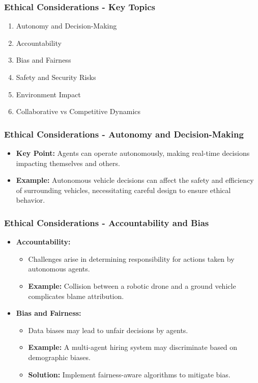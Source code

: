 \documentclass[aspectratio=169]{beamer}
\begin{document}
\begin{frame}[fragile]
    \frametitle{Ethical Considerations - Key Topics}
    \begin{enumerate}
        \item Autonomy and Decision-Making
        \item Accountability
        \item Bias and Fairness
        \item Safety and Security Risks
        \item Environment Impact
        \item Collaborative vs Competitive Dynamics
    \end{enumerate}
\end{frame}

\begin{frame}[fragile]
    \frametitle{Ethical Considerations - Autonomy and Decision-Making}
    \begin{itemize}
        \item \textbf{Key Point:} Agents can operate autonomously, making real-time decisions impacting themselves and others.
        \item \textbf{Example:} Autonomous vehicle decisions can affect the safety and efficiency of surrounding vehicles, necessitating careful design to ensure ethical behavior.
    \end{itemize}
\end{frame}

\begin{frame}[fragile]
    \frametitle{Ethical Considerations - Accountability and Bias}
    \begin{itemize}
        \item \textbf{Accountability:}
        \begin{itemize}
            \item Challenges arise in determining responsibility for actions taken by autonomous agents.
            \item \textbf{Example:} Collision between a robotic drone and a ground vehicle complicates blame attribution.
        \end{itemize}
        
        \item \textbf{Bias and Fairness:}
        \begin{itemize}
            \item Data biases may lead to unfair decisions by agents.
            \item \textbf{Example:} A multi-agent hiring system may discriminate based on demographic biases.
            \item \textbf{Solution:} Implement fairness-aware algorithms to mitigate bias.
        \end{itemize}
    \end{itemize}
\end{frame}
\end{document}
